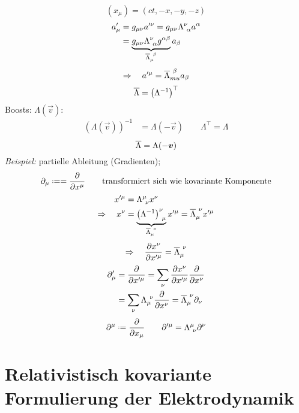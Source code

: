 \begin{equation*}
(x_{\mu}) = (ct, -x, -y, -z)
\end{equation*}
\begin{align*}
a'_{\mu} &= g_{\mu \nu} a'^{\nu} = g_{\mu \nu} \Lambda^{\nu} _{\ \alpha} a ^{\alpha}\\
&= \ub{g_{\mu \nu} \Lambda^{\nu}_{\ \alpha} g^{\alpha \beta}}_{\ol{\Lambda}_{\mu} ^{\ \beta}} a_{\beta}
\end{align*}
\begin{equation*}
\Rightarrow \quad a'^{\mu} = \overline{\Lambda}_{mu}^{\ \beta} a_{\beta}
\end{equation*}
\begin{equation*}
\overline{\Lambda} = \left(\Lambda^{-1}\right)^{\top}
\end{equation*}
Boosts: $ \Lambda(\vec{v}) $:
\begin{align*}
\left(\Lambda(\vec{v})\right)^{-1} &= \Lambda(-\vec{v}) \qquad \Lambda^{\top} = \Lambda
\end{align*}
\begin{equation*}
\overline{\Lambda} = \Lambda(- \bm{v})
\end{equation*}
\emph{Beispiel:} partielle Ableitung (Gradienten);
\begin{equation*}
\partial_{\mu} \defeq = \prt{}{x^{\mu}} \qquad \tx{transformiert sich wie kovariante Komponente}
\end{equation*}
\begin{align*}
x'^{\mu} &= \Lambda ^{\mu} _{\ \nu} x^{\nu} \\
\Rightarrow \quad x^{\nu} &= \ub{\left(\Lambda^{-1}\right)^{\nu}_{\ \mu}}_{\ol{\Lambda}_{\mu} ^{\ \nu}} x'^{\mu} = \ol{\Lambda}_{\mu} ^{\ \nu} x'^{\mu}
\end{align*}
\begin{equation*}
\Rightarrow \quad \frac{\partial x^{\nu}}{\partial x'^{\mu}} = \overline{\Lambda} _{\mu} ^{ \ \nu}
\end{equation*}
\begin{align*}
\partial '_{\mu} &= \frac{\partial }{\partial x'^{\mu}} = \sum_{\nu} \frac{\partial x^{\nu}}{\partial x'^{\mu}} \frac{\partial }{\partial x^{\nu}} \\
&= \sum_{\nu} \Lambda_{\mu}^{\ \nu} \frac{\partial }{\partial x^{\nu}} = \overline{\Lambda}_{\mu}^{\ \nu} \partial_{\nu}
\end{align*}
\begin{equation*}
\partial ^{\mu} \defeq \prt{}{x_{\mu}} \qquad \partial '^{\mu} = \Lambda^{\mu} _{\ \nu} \partial ^{\nu}
\end{equation*}

\section{Relativistisch kovariante Formulierung der Elektrodynamik}

